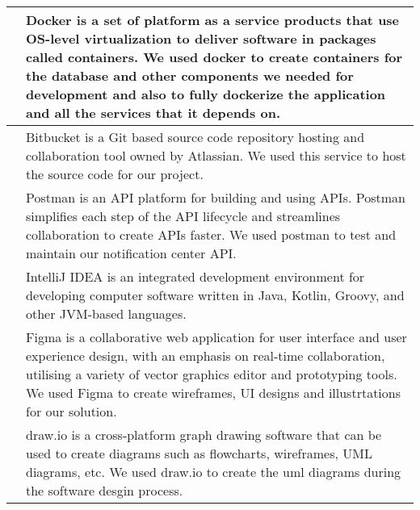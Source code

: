 \begin{table}[hbt!]
      \begin{tabular}{ | m{} | m{} | }
            \hline
            \centering    & Docker is a set of platform as a service products that use OS-level virtualization to deliver software in packages called containers. We used docker to create containers for the database and other components we needed for development and also to fully dockerize the application and all the services that it depends on. \\
            \hline
            \centering & Bitbucket is a Git based source code repository hosting and collaboration tool owned by Atlassian. We used this service to host the source code for our project.                                                                                                                                                               \\
            \hline
            \centering   & Postman is an API platform for building and using APIs. Postman simplifies each step of the API lifecycle and streamlines collaboration to create APIs faster. We used postman to test and maintain our notification center API.                                                                                               \\
            \hline
            \centering  & IntelliJ IDEA is an integrated development environment for developing computer software written in Java, Kotlin, Groovy, and other JVM-based languages.                                                                                                                                                                        \\
            \hline
            \centering     & Figma is a collaborative web application for user interface and user experience design, with an emphasis on real-time collaboration, utilising a variety of vector graphics editor and prototyping tools. We used Figma to create wireframes, UI designs and illustrtations for our solution.                                  \\
            \hline
            \centering    & draw.io is a cross-platform graph drawing software that can be used to create diagrams such as flowcharts, wireframes, UML diagrams, etc. We used draw.io to create the uml diagrams during the software desgin process.                                                                                                       \\

\end{tabular}
\end{table}
